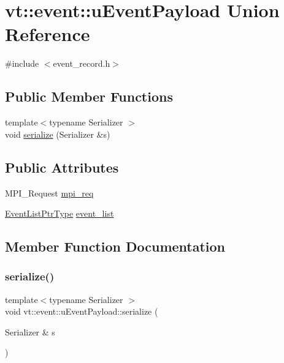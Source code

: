 \hypertarget{unionvt_1_1event_1_1u_event_payload}{}\section{vt\+:\+:event\+:\+:u\+Event\+Payload Union Reference}
\label{unionvt_1_1event_1_1u_event_payload}


{\ttfamily \#include $<$event\+\_\+record.\+h$>$}

\subsection*{Public Member Functions}
\begin{DoxyCompactItemize}
\item 
{\footnotesize template$<$typename Serializer $>$ }\\void \hyperlink{unionvt_1_1event_1_1u_event_payload_ad50a05c8cc5602f73caed2b0fff45e3e}{serialize} (Serializer \&s)
\end{DoxyCompactItemize}
\subsection*{Public Attributes}
\begin{DoxyCompactItemize}
\item 
M\+P\+I\+\_\+\+Request \hyperlink{unionvt_1_1event_1_1u_event_payload_a36fd9f8a09add70a3379f3e646cc5b27}{mpi\+\_\+req}
\item 
\hyperlink{namespacevt_1_1event_aa507caad8ea8ee959ccef2d57753dceb}{Event\+List\+Ptr\+Type} \hyperlink{unionvt_1_1event_1_1u_event_payload_a1b6f1d27b5e4442788a9e9ca04446a14}{event\+\_\+list}
\end{DoxyCompactItemize}


\subsection{Member Function Documentation}
\mbox{\label{unionvt_1_1event_1_1u_event_payload_ad50a05c8cc5602f73caed2b0fff45e3e}} 
\subsubsection{\texorpdfstring{serialize()}{serialize()}}
{\footnotesize\ttfamily template$<$typename Serializer $>$ \\
void vt\+::event\+::u\+Event\+Payload\+::serialize (\begin{DoxyParamCaption}\item[{Serializer \&}]{s }\end{DoxyParamCaption})\hspace{0.3cm}{\ttfamily [inline]}}



